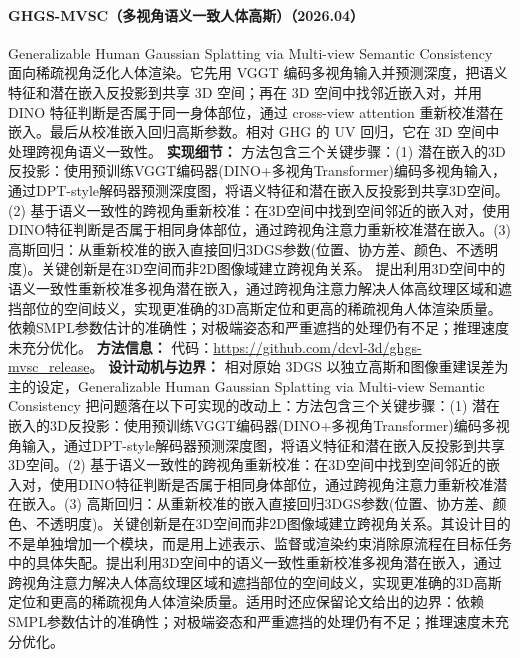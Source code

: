 \paragraph{GHGS-MVSC（多视角语义一致人体高斯）（2026.04）}
Generalizable Human Gaussian Splatting via Multi-view Semantic Consistency~\cite{2604_25466} 面向稀疏视角泛化人体渲染。它先用 VGGT 编码多视角输入并预测深度，把语义特征和潜在嵌入反投影到共享 3D 空间；再在 3D 空间中找邻近嵌入对，并用 DINO 特征判断是否属于同一身体部位，通过 cross-view attention 重新校准潜在嵌入。最后从校准嵌入回归高斯参数。相对 GHG 的 UV 回归，它在 3D 空间中处理跨视角语义一致性。
\textbf{实现细节：} 方法包含三个关键步骤：(1) 潜在嵌入的3D反投影：使用预训练VGGT编码器(DINO+多视角Transformer)编码多视角输入，通过DPT-style解码器预测深度图，将语义特征和潜在嵌入反投影到共享3D空间。(2) 基于语义一致性的跨视角重新校准：在3D空间中找到空间邻近的嵌入对，使用DINO特征判断是否属于相同身体部位，通过跨视角注意力重新校准潜在嵌入。(3) 高斯回归：从重新校准的嵌入直接回归3DGS参数(位置、协方差、颜色、不透明度)。关键创新是在3D空间而非2D图像域建立跨视角关系。 提出利用3D空间中的语义一致性重新校准多视角潜在嵌入，通过跨视角注意力解决人体高纹理区域和遮挡部位的空间歧义，实现更准确的3D高斯定位和更高的稀疏视角人体渲染质量。 依赖SMPL参数估计的准确性；对极端姿态和严重遮挡的处理仍有不足；推理速度未充分优化。
\textbf{方法信息：} 代码：\url{https://github.com/dcvl-3d/ghgs-mvsc_release}。
\textbf{设计动机与边界：} 相对原始 3DGS 以独立高斯和图像重建误差为主的设定，Generalizable Human Gaussian Splatting via Multi-view Semantic Consistency 把问题落在以下可实现的改动上：方法包含三个关键步骤：(1) 潜在嵌入的3D反投影：使用预训练VGGT编码器(DINO+多视角Transformer)编码多视角输入，通过DPT-style解码器预测深度图，将语义特征和潜在嵌入反投影到共享3D空间。(2) 基于语义一致性的跨视角重新校准：在3D空间中找到空间邻近的嵌入对，使用DINO特征判断是否属于相同身体部位，通过跨视角注意力重新校准潜在嵌入。(3) 高斯回归：从重新校准的嵌入直接回归3DGS参数(位置、协方差、颜色、不透明度)。关键创新是在3D空间而非2D图像域建立跨视角关系。其设计目的不是单独增加一个模块，而是用上述表示、监督或渲染约束消除原流程在目标任务中的具体失配。提出利用3D空间中的语义一致性重新校准多视角潜在嵌入，通过跨视角注意力解决人体高纹理区域和遮挡部位的空间歧义，实现更准确的3D高斯定位和更高的稀疏视角人体渲染质量。适用时还应保留论文给出的边界：依赖SMPL参数估计的准确性；对极端姿态和严重遮挡的处理仍有不足；推理速度未充分优化。
